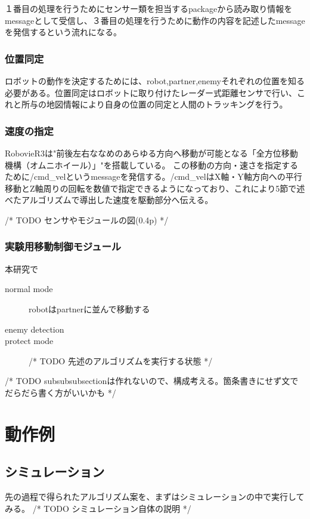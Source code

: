 \documentclass{kuthesis}
\begin{document}
１番目の処理を行うためにセンサー類を担当するpackageから読み取り情報をmessageとして受信し、３番目の処理を行うために動作の内容を記述したmessageを発信するという流れになる。

\subsubsection{位置同定}
ロボットの動作を決定するためには、robot,partner,enemyそれぞれの位置を知る必要がある。位置同定はロボットに取り付けたレーダー式距離センサで行い、これと所与の地図情報により自身の位置の同定と人間のトラッキングを行う。

\subsubsection{速度の指定}
RobovieR3は"前後左右ななめのあらゆる方向へ移動が可能となる「全方位移動機構（オムニホイール）」"を搭載している。
この移動の方向・速さを指定するために/cmd_velというmessageを発信する。/cmd_velはX軸・Y軸方向への平行移動とZ軸周りの回転を数値で指定できるようになっており、これにより5節で述べたアルゴリズムで導出した速度を駆動部分へ伝える。

/* TODO センサやモジュールの図(0.4p) */

\subsubsection{実験用移動制御モジュール}

本研究で

\begin{description}
  \item[normal mode] robotはpartnerに並んで移動する
  \item[enemy detection]
  \item[protect mode] /* TODO 先述のアルゴリズムを実行する状態 */
\end{description}

/* TODO \uparrow subsubsubsectionは作れないので、構成考える。箇条書きにせず文でだらだら書く方がいいかも */




\section{動作例}

\subsection{シミュレーション}
先の過程で得られたアルゴリズム案を、まずはシミュレーションの中で実行してみる。
/* TODO シミュレーション自体の説明 */
\end{document}
